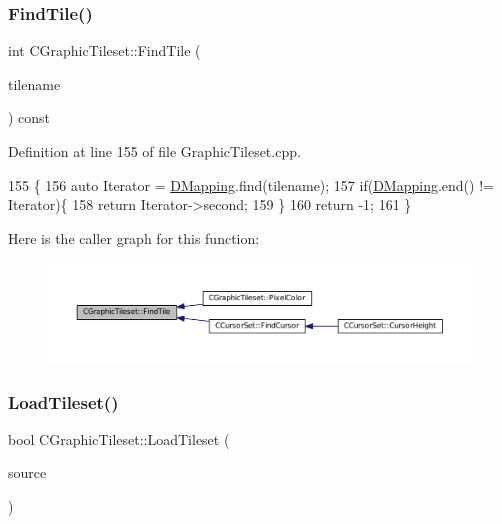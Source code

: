 \subsubsection{\texorpdfstring{Find\+Tile()}{FindTile()}}
{\footnotesize\ttfamily int C\+Graphic\+Tileset\+::\+Find\+Tile (\begin{DoxyParamCaption}\item[{const std\+::string \&}]{tilename }\end{DoxyParamCaption}) const}



Definition at line 155 of file Graphic\+Tileset.\+cpp.


\begin{DoxyCode}
155                                                             \{
156     \textcolor{keyword}{auto} Iterator = \hyperlink{classCGraphicTileset_a17cd13f68f77ea4976b59b37b10e914b}{DMapping}.find(tilename);
157     \textcolor{keywordflow}{if}(\hyperlink{classCGraphicTileset_a17cd13f68f77ea4976b59b37b10e914b}{DMapping}.end() != Iterator)\{
158         \textcolor{keywordflow}{return} Iterator->second;
159     \}
160     \textcolor{keywordflow}{return} -1;
161 \}
\end{DoxyCode}
Here is the caller graph for this function\+:
\nopagebreak
\begin{figure}[H]
\begin{center}
\leavevmode
\includegraphics[width=350pt]{classCGraphicTileset_ab8f2c2b2f2095b17d53c3dc475d5685c_icgraph}
\end{center}
\end{figure}
\hypertarget{classCGraphicTileset_a7d47754f26f03958be28a064f54eef1d}{}\label{classCGraphicTileset_a7d47754f26f03958be28a064f54eef1d} 
\subsubsection{\texorpdfstring{Load\+Tileset()}{LoadTileset()}}
{\footnotesize\ttfamily bool C\+Graphic\+Tileset\+::\+Load\+Tileset (\begin{DoxyParamCaption}\item[{std\+::shared\+\_\+ptr$<$ \hyperlink{classCDataSource}{C\+Data\+Source} $>$}]{source }\end{DoxyParamCaption})}



